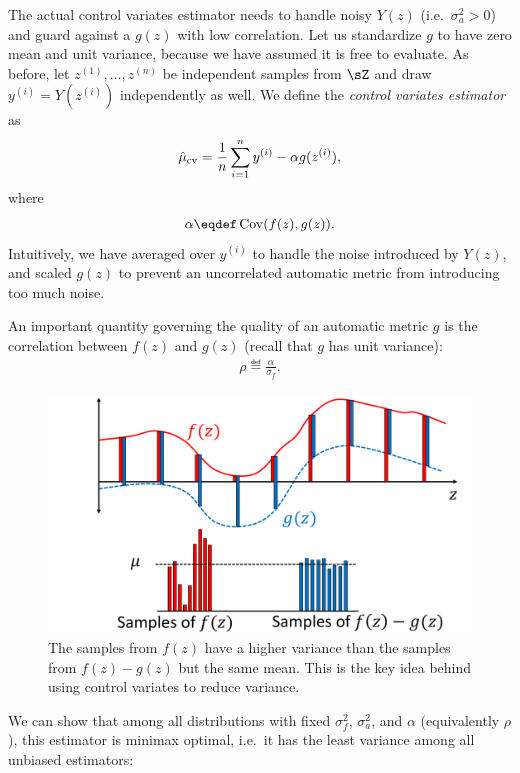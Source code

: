 The actual control variates estimator needs to
handle noisy $Y(z)$ (i.e.\ $\sigma^2_a > 0$) and
guard against a $g(z)$ with low correlation.
Let us standardize $g$ to have zero mean and unit variance, because we have
assumed it is free to evaluate.
As before, let $z^{(1)}, \dots, z^{(n)}$ be independent samples from $\sZ$ and
draw $y^{(i)} = Y(z^{(i)})$ independently as well.
We define the \emph{control variates estimator} as
\begin{align}
\hat \mu_\text{cv} = \frac{1}{n} \sum_{i=1}^n y^{(i)} - \alpha g(z^{(i)}),
\end{align}
where
\begin{align}
  \alpha \eqdef \Cov(f(z),g(z)).
\end{align}
Intuitively, we have averaged over $y^{(i)}$ to handle the noise introduced by $Y(z)$, and scaled $g(z)$ to prevent an uncorrelated automatic metric from introducing too much noise.

An important quantity governing the quality of an automatic metric $g$
is the correlation between $f(z)$ and $g(z)$ (recall that $g$ has unit variance):
\begin{align}
\rho \eqdef \frac{\alpha}{\sigma_f}.  %
\end{align}

\begin{figure}
\centering
  \includegraphics[width=0.8\columnwidth]{figures/variance_reduction_extreme}
  \caption[Intuition for control variates]{\label{fig:price:variance_reduction}
  The samples from $f(z)$ have a higher variance than the samples
  from $f(z)-g(z)$ but the same mean. This is the key idea behind using control variates to reduce variance.}
\end{figure}

We can show that among all distributions with
fixed $\sigma^2_f$, $\sigma^2_a$, and $\alpha$ (equivalently $\rho$), this estimator is minimax optimal, i.e.\ it has the least variance among all unbiased estimators:

